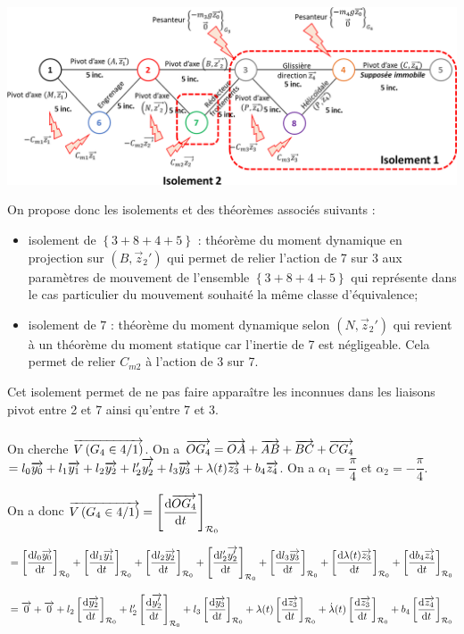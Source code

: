 \documentclass[10pt,fleqn]{article} %
\begin{document}
\begin{center}
\includegraphics[width=\textwidth]{images/fig_05}
\end{center}

On propose donc les isolements et des théorèmes associés suivants : 
\begin{itemize}
\item isolement de $\left\{3+8+4+5\right\}$ : théorème du moment dynamique en projection sur $\left(B,\overrightarrow{z}_2'\right)$ qui permet de relier l'action de 7 sur 3 aux paramètres de mouvement de l'ensemble $\left\{3+8+4+5\right\}$ qui représente dans le cas particulier du mouvement souhaité la même classe d'équivalence;
\item isolement de $7$ : théorème du moment dynamique selon $\left(N,\overrightarrow{z}_2'\right)$ qui revient à un théorème du moment statique car l'inertie de 7 est négligeable. Cela permet de relier $C_{m2}$ à l'action de 3 sur 7.
\end{itemize}
Cet isolement permet de ne pas faire apparaître les inconnues dans les liaisons pivot entre 2 et 7 ainsi qu'entre 7 et 3. 
\subparagraph{}%
On cherche $\overrightarrow{V\left( {G_4} \in {4}/{1}\right)}$. On a $\overrightarrow{OG_4}=\overrightarrow{OA}+\overrightarrow{AB}+\overrightarrow{BC}+\overrightarrow{CG_4}$ $=l_0\overrightarrow{y_0}+l_1\overrightarrow{y_1}+l_2\overrightarrow{y_2}+l_2'\overrightarrow{y_2'}+l_3\overrightarrow{y_3}+\lambda(t)\overrightarrow{z_3}+b_4\overrightarrow{z_4}$.
On a $\alpha_1=\dfrac{\pi}{4}$ et $\alpha_2=-\dfrac{\pi}{4}$.

On a donc $\overrightarrow{V\left( {G_4} \in {4}/{1}\right)}= \left[\dfrac{\text{d} \overrightarrow{OG_4}}{\text{d} t}\right]_{\mathcal{R}_{0}} $ 

$= 
\left[\dfrac{\text{d} l_0\overrightarrow{y_0}}{\text{d} t}\right]_{\mathcal{R}_{0}}+
\left[\dfrac{\text{d} l_1\overrightarrow{y_1}}{\text{d} t}\right]_{\mathcal{R}_{0}}+
\left[\dfrac{\text{d} l_2\overrightarrow{y_2}}{\text{d} t}\right]_{\mathcal{R}_{0}}+
\left[\dfrac{\text{d} l_2'\overrightarrow{y_2'}}{\text{d} t}\right]_{\mathcal{R}_{0}}+
\left[\dfrac{\text{d} l_3\overrightarrow{y_3}}{\text{d} t}\right]_{\mathcal{R}_{0}}+
\left[\dfrac{\text{d} \lambda(t)\overrightarrow{z_3}}{\text{d} t}\right]_{\mathcal{R}_{0}}+
\left[\dfrac{\text{d} b_4\overrightarrow{z_4}}{\text{d} t}\right]_{\mathcal{R}_{0}}$

$= 
\overrightarrow{0}+
\overrightarrow{0}+
l_2\left[\dfrac{\text{d} \overrightarrow{y_2}}{\text{d} t}\right]_{\mathcal{R}_{0}}+
l_2'\left[\dfrac{\text{d} \overrightarrow{y_2'}}{\text{d} t}\right]_{\mathcal{R}_{0}}+
l_3\left[\dfrac{\text{d} \overrightarrow{y_3}}{\text{d} t}\right]_{\mathcal{R}_{0}}+
\lambda(t)\left[\dfrac{\text{d} \overrightarrow{z_3}}{\text{d} t}\right]_{\mathcal{R}_{0}}+
\dot{\lambda}(t)\left[\dfrac{\text{d} \overrightarrow{z_3}}{\text{d} t}\right]_{\mathcal{R}_{0}}+
b_4\left[\dfrac{\text{d} \overrightarrow{z_4}}{\text{d} t}\right]_{\mathcal{R}_{0}}$
\end{document}
